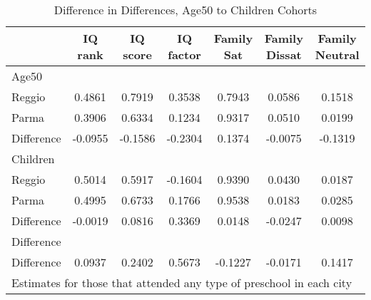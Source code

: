 \begin{table}[htbp]\centering
\caption{Difference in Differences, Age50 to Children Cohorts}
\begin{tabular}{l*{6}{c}}
\hline\hline
            &     IQ rank&    IQ score&   IQ factor&  Family Sat&Family Dissat&Family Neutral\\
\hline
Age50       &            &            &            &            &            &            \\
Reggio      &      0.4861&      0.7919&      0.3538&      0.7943&      0.0586&      0.1518\\
Parma       &      0.3906&      0.6334&      0.1234&      0.9317&      0.0510&      0.0199\\
Difference  &     -0.0955&     -0.1586&     -0.2304&      0.1374&     -0.0075&     -0.1319\\
\hline
Children    &            &            &            &            &            &            \\
Reggio      &      0.5014&      0.5917&     -0.1604&      0.9390&      0.0430&      0.0187\\
Parma       &      0.4995&      0.6733&      0.1766&      0.9538&      0.0183&      0.0285\\
Difference  &     -0.0019&      0.0816&      0.3369&      0.0148&     -0.0247&      0.0098\\
\hline
Difference  &            &            &            &            &            &            \\
Difference  &      0.0937&      0.2402&      0.5673&     -0.1227&     -0.0171&      0.1417\\
\hline\hline
\multicolumn{7}{l}{\footnotesize Estimates for those that attended any type of preschool in each city}\\
\end{tabular}
\end{table}
